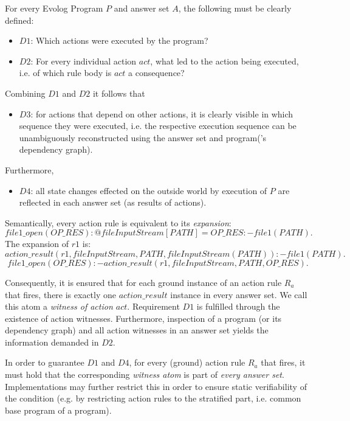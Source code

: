 For every Evolog Program $P$ and answer set $A$, the following must be clearly defined:
\begin{itemize}
	\item $D1$: Which actions were executed by the program?
	\item $D2$: For every individual action $act$, what led to the action being executed, i.e. of which rule body is $act$ a consequence?
\end{itemize}
Combining $D1$ and $D2$ it follows that 
\begin{itemize}
	\item $D3$: for actions that depend on other actions, it is clearly visible in which sequence they were executed, i.e. the respective execution sequence can be unambiguously reconstructed using the answer set and program('s dependency graph).
\end{itemize}
Furthermore,
\begin{itemize}
\item $D4$: all state changes effected on the outside world by execution of $P$ are reflected in each answer set (as results of actions).
\end{itemize}


\begin{definition}
\label{def:action-rule-expansion}
Semantically, every action rule is equivalent to its \emph{expansion}:
\[
file1\_open(OP\_RES) : @fileInputStream[PATH] = OP\_RES :- file1(PATH). %
\]
The expansion of $r1$ is:
\[
action\_result(r1, fileInputStream, PATH, fileInputStream(PATH)) :- file1(PATH). 
\]
\[
file1\_open(OP\_RES) :- action\_result(r1, fileInputStream, PATH, OP\_RES).
\]
\end{definition}
Consequently, it is ensured that for each ground instance of an action rule $R_a$ that fires, there is exactly one $action\_result$ instance in every answer set. We call this atom a \emph{witness of action $act$}. Requirement $D1$ is fulfilled through the existence of action witnesses. Furthermore, inspection of a program (or its dependency graph) and all action witnesses in an answer set yields the information demanded in $D2$.

\begin{definition}
\label{def:action-rule-applicability}
In order to guarantee $D1$ and $D4$, for every (ground) action rule $R_a$ that fires, it must hold that the corresponding \emph{witness atom} is part of \emph{every answer set}.
Implementations may further restrict this in order to ensure static verifiability of the condition (e.g. by restricting action rules to  the stratified part, i.e. common base program of a program).
\end{definition}

